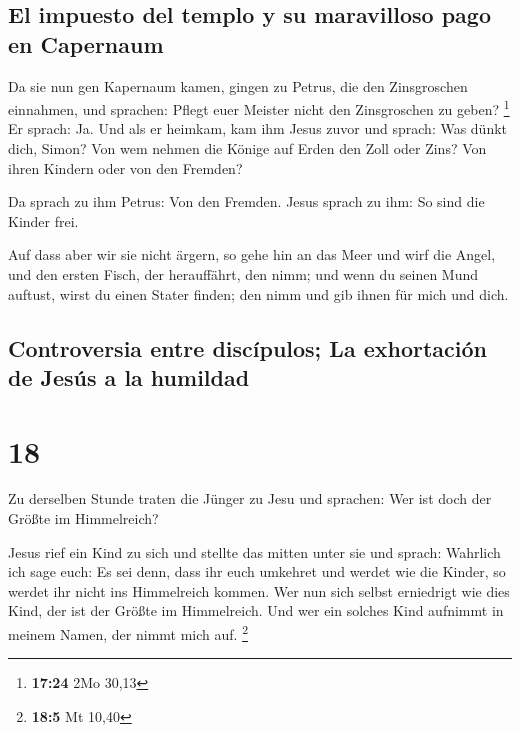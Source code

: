 \hypertarget{el-impuesto-del-templo-y-su-maravilloso-pago-en-capernaum}{%
\subsection{El impuesto del templo y su maravilloso pago en
Capernaum}\label{el-impuesto-del-templo-y-su-maravilloso-pago-en-capernaum}}

 Da sie nun gen Kapernaum kamen, gingen zu Petrus, die
den Zinsgroschen einnahmen, und sprachen: Pflegt euer Meister nicht den
Zinsgroschen zu geben? \footnote{\textbf{17:24} 2Mo 30,13}
 Er sprach: Ja. Und als er heimkam, kam ihm Jesus zuvor
und sprach: Was dünkt dich, Simon? Von wem nehmen die Könige auf Erden
den Zoll oder Zins? Von ihren Kindern oder von den Fremden?

 Da sprach zu ihm Petrus: Von den Fremden. Jesus sprach
zu ihm: So sind die Kinder frei.

 Auf dass aber wir sie nicht ärgern, so gehe hin an das
Meer und wirf die Angel, und den ersten Fisch, der herauffährt, den
nimm; und wenn du seinen Mund auftust, wirst du einen Stater finden; den
nimm und gib ihnen für mich und dich.

\hypertarget{controversia-entre-discuxedpulos-la-exhortaciuxf3n-de-jesuxfas-a-la-humildad}{%
\subsection{Controversia entre discípulos; La exhortación de Jesús a la
humildad}\label{controversia-entre-discuxedpulos-la-exhortaciuxf3n-de-jesuxfas-a-la-humildad}}

\hypertarget{section-17}{%
\section{18}\label{section-17}}

 Zu derselben Stunde traten die Jünger zu Jesu und
sprachen: Wer ist doch der Größte im Himmelreich?

 Jesus rief ein Kind zu sich und stellte das mitten unter
sie  und sprach: Wahrlich ich sage euch: Es sei denn, dass
ihr euch umkehret und werdet wie die Kinder, so werdet ihr nicht ins
Himmelreich kommen.  Wer nun sich selbst erniedrigt wie
dies Kind, der ist der Größte im Himmelreich.  Und wer ein
solches Kind aufnimmt in meinem Namen, der nimmt mich auf. \footnote{\textbf{18:5}
  Mt 10,40}


